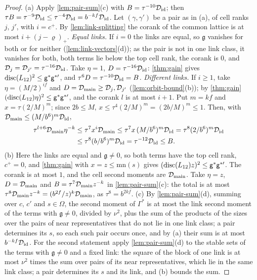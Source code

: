 \begin{proof}
(a) Apply \cref{lem:pair-sum}(c) with $B=\tau^{-10}\mathcal D_{\rm id}$; then $\tau B=\tau^{-9}\mathcal D_{\rm id}\le\tau^{-4}\mathcal D_{\rm id}=b^{-kf}\mathcal D_{\rm id}$. Let $(\gamma,\gamma')$ be a pair as in (a), of cell ranks $j$, $j'$, with $i=c^+$. By \cref{lem:link-splitting}
the corank of the common lattice is at most $i+(j-\varrho)_+$. \emph{Equal links.} If $i=0$ the links are equal, so $\mathfrak g$ vanishes for both or for neither (\cref{lem:link-vectors}(d)); as the pair is not in one link class,
it vanishes for both, both terms lie below the top cell rank, the corank is $0$, and $\mathcal D_j=\mathcal D_{j'}=\tau^{-16}\mathcal D_{\rm id}$. Take $\eta=1$, $D=\tau^{-16}\mathcal D_{\rm id}$: \cref{thm:gain} gives
$\operatorname{disc}(L_{12})^2\le\mathsf g^*\mathsf g^{*\prime}$, and $\tau^6D=\tau^{-10}\mathcal D_{\rm id}=B$. \emph{Different links.} If $i\ge1$, take $\eta=(M/2)^{if}$ and $D=\mathcal D_{\rm main}\ge\mathcal D_j,\mathcal D_{j'}$ (\cref{lem:orbit-bound}(b)); by \cref{thm:gain}
$(\operatorname{disc}(L_{12})\eta)^2\le\mathsf g^*\mathsf g^{*\prime}$, and the corank $l$ is at most $i+1$. Put $m=kf$ and $x=\tau(2/M)^m$; since $2b\le M$, $x\le\tau^4(2/M)^m=(2b/M)^m\le1$. Then, with $\mathcal D_{\rm main}\le(M/b^6)^m\mathcal D_{\rm id}$,
\begin{align*}
  \tau^{l+6}\mathcal D_{\rm main}\eta^{-k}&\le\tau^7x^i\mathcal D_{\rm main}\le\tau^7x\,(M/b^6)^m\mathcal D_{\rm id}=\tau^8(2/b^6)^m\mathcal D_{\rm id}\\
  &\le\tau^8(b/b^6)^m\mathcal D_{\rm id}=\tau^{-12}\mathcal D_{\rm id}\le B.
\end{align*}
(b) Here the links are equal and $\mathfrak g\ne0$, so both terms have the top cell rank, $c^+=0$, and \cref{thm:gain} with $x=z\le\mathrm{mn}(s)$ gives $(\operatorname{disc}(L_{12})z)^2\le\mathsf g^*\mathsf g^{*\prime}$. The corank is at most $1$, and the
cell second moments are $\mathcal D_{\rm main}$. Take $\eta=z$, $D=\mathcal D_{\rm main}$ and $B=\tau^7\mathcal D_{\rm main}z^{-k}$ in \cref{lem:pair-sum}(c): the total is at most $\tau^8\mathcal D_{\rm main}z^{-k}=(b^{2f}/z)^k\mathcal D_{\rm main}$, as
$\tau^8=b^{2kf}$.
(c) By \cref{lem:pair-sum}(d), summing over $c$, $c'$ and $s\in\Omega$, the second moment of $\Gamma^*$ is at most the link second moment of the terms with $\mathfrak g\ne0$, divided by $\nu^2$, plus the sum of the products of
the sizes over the pairs of near representatives that do not lie in one link class; a pair determines its $s$, so each such pair occurs once, and by (a) their sum is at most $b^{-kf}\mathcal D_{\rm id}$. For the second
statement apply \cref{lem:pair-sum}(d) to the stable sets of the terms with $\mathfrak g\ne0$ and a fixed link: the square of the block of one link is at most $\nu^2$ times the sum over pairs of its near representatives, which lie in the
same link class; a pair determines its $s$ and its link, and (b) bounds the sum.
\end{proof}
